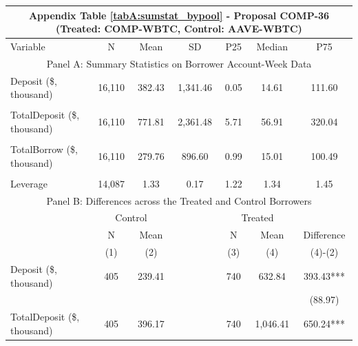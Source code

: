 
\clearpage
\newpage
\begin{table}[ht!]
\footnotesize 

\centering
\def\sym#1{\ifmmode^{#1}\else\(^{#1}\)\fi}


\begin{tabular*}{\linewidth}{@{\extracolsep{\fill}}lcccccc }
      \multicolumn{7}{c}{Appendix Table \ref{tabA:sumstat_bypool} - Proposal COMP-36 (Treated: COMP-WBTC, Control: AAVE-WBTC)} \\
      
    \toprule
     Variable  &N & Mean & SD & P25 & Median & P75 \\
     \midrule
    \multicolumn{7}{c}{Panel A: Summary Statistics on Borrower Account-Week Data} \\
    \midrule
    Deposit (\$, thousand) & 16,110 & 382.43 & 1,341.46 & 0.05  & 14.61 & 111.60 \\
          &       &       &       &       &       &  \\
    TotalDeposit (\$, thousand) & 16,110 & 771.81 & 2,361.48 & 5.71  & 56.91 & 320.04 \\
          &       &       &       &       &       &  \\
    TotalBorrow (\$, thousand) & 16,110 & 279.76 & 896.60 & 0.99  & 15.01 & 100.49 \\
          &       &       &       &       &       &  \\
    Leverage & 14,087 & 1.33  & 0.17  & 1.22  & 1.34  & 1.45 \\
    \midrule
        \multicolumn{7}{c}{Panel B: Differences across the Treated and Control Borrowers} \\
\midrule
          & \multicolumn{2}{c}{Control} &       & \multicolumn{2}{c}{Treated} &  \\
\cmidrule{2-3}\cmidrule{5-6}          & N & Mean &       & N & Mean & Difference \\
\cmidrule{2-3}\cmidrule{5-6}          & (1) & (2) &       & (3) & (4) & (4)-(2) \\
\cmidrule{2-7}    Deposit (\$, thousand) & 405   & 239.41 &       & 740   & 632.84 & 393.43*** \\
          &       &       &       &       &       & (88.97) \\
    TotalDeposit (\$, thousand) & 405   & 396.17 &       & 740   & 1,046.41 & 650.24*** \\

\end{tabular*}
\end{table}
